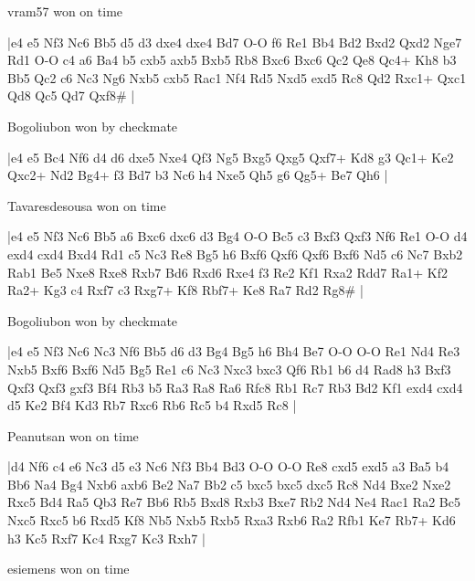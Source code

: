 \showboard

vram57 won on time

\makegametitle
|e4 e5 Nf3 Nc6 Bb5 d5 d3 dxe4 dxe4 Bd7 O-O f6 Re1 Bb4 Bd2 Bxd2 Qxd2 Nge7 Rd1 O-O c4 a6 Ba4 b5 cxb5 axb5 Bxb5 Rb8 Bxc6 Bxc6 Qc2 Qe8 Qc4+ Kh8 b3 Bb5 Qc2 c6 Nc3 Ng6 Nxb5 cxb5 Rac1 Nf4 Rd5 Nxd5 exd5 Rc8 Qd2 Rxc1+ Qxc1 Qd8 Qc5 Qd7 Qxf8\#  |

\showboard

Bogoliubon won by checkmate

\makegametitle
|e4 e5 Bc4 Nf6 d4 d6 dxe5 Nxe4 Qf3 Ng5 Bxg5 Qxg5 Qxf7+ Kd8 g3 Qc1+ Ke2 Qxc2+ Nd2 Bg4+ f3 Bd7 b3 Nc6 h4 Nxe5 Qh5 g6 Qg5+ Be7 Qh6  |

\showboard

Tavaresdesousa won on time

\makegametitle
|e4 e5 Nf3 Nc6 Bb5 a6 Bxc6 dxc6 d3 Bg4 O-O Bc5 c3 Bxf3 Qxf3 Nf6 Re1 O-O d4 exd4 cxd4 Bxd4 Rd1 c5 Nc3 Re8 Bg5 h6 Bxf6 Qxf6 Qxf6 Bxf6 Nd5 c6 Nc7 Bxb2 Rab1 Be5 Nxe8 Rxe8 Rxb7 Bd6 Rxd6 Rxe4 f3 Re2 Kf1 Rxa2 Rdd7 Ra1+ Kf2 Ra2+ Kg3 c4 Rxf7 c3 Rxg7+ Kf8 Rbf7+ Ke8 Ra7 Rd2 Rg8\#  |

\showboard

Bogoliubon won by checkmate

\makegametitle
|e4 e5 Nf3 Nc6 Nc3 Nf6 Bb5 d6 d3 Bg4 Bg5 h6 Bh4 Be7 O-O O-O Re1 Nd4 Re3 Nxb5 Bxf6 Bxf6 Nd5 Bg5 Re1 c6 Nc3 Nxc3 bxc3 Qf6 Rb1 b6 d4 Rad8 h3 Bxf3 Qxf3 Qxf3 gxf3 Bf4 Rb3 b5 Ra3 Ra8 Ra6 Rfc8 Rb1 Rc7 Rb3 Bd2 Kf1 exd4 cxd4 d5 Ke2 Bf4 Kd3 Rb7 Rxc6 Rb6 Rc5 b4 Rxd5 Rc8  |

\showboard

Peanutsan won on time

\makegametitle
|d4 Nf6 c4 e6 Nc3 d5 e3 Nc6 Nf3 Bb4 Bd3 O-O O-O Re8 cxd5 exd5 a3 Ba5 b4 Bb6 Na4 Bg4 Nxb6 axb6 Be2 Na7 Bb2 c5 bxc5 bxc5 dxc5 Rc8 Nd4 Bxe2 Nxe2 Rxc5 Bd4 Ra5 Qb3 Re7 Bb6 Rb5 Bxd8 Rxb3 Bxe7 Rb2 Nd4 Ne4 Rac1 Ra2 Bc5 Nxc5 Rxc5 b6 Rxd5 Kf8 Nb5 Nxb5 Rxb5 Rxa3 Rxb6 Ra2 Rfb1 Ke7 Rb7+ Kd6 h3 Kc5 Rxf7 Kc4 Rxg7 Kc3 Rxh7  |

\showboard

esiemens won on time

